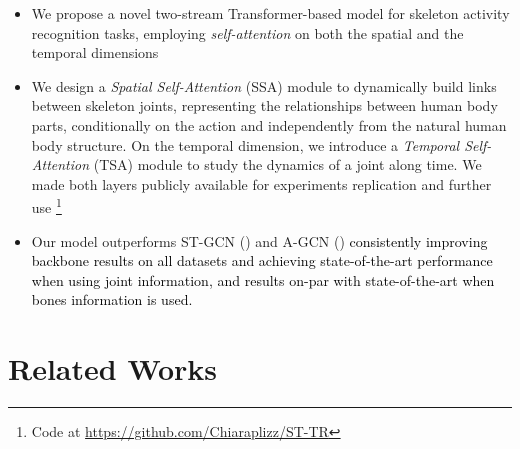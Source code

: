 \documentclass[times,twocolumn,final,authoryear]{elsarticle}
\DeclareRobustCommand{\new}[1]
{{\textcolor{black}{#1}}}
\begin{document}
\begin{itemize}
    \item We propose a novel two-stream Transformer-based model for skeleton activity recognition tasks, employing \textit{self-attention} on both the spatial and the temporal dimensions
    \item We design a \textit{Spatial Self-Attention} (SSA) module to dynamically build links between skeleton joints, representing the relationships between human body parts, conditionally on the action and independently from the natural human body structure. On the temporal dimension, we introduce a  \textit{Temporal Self-Attention} (TSA) module to study the dynamics of a joint along time. We made both layers publicly available for experiments replication and further use \footnote{Code at \color{magenta}\url{https://github.com/Chiaraplizz/ST-TR}}
\item Our model outperforms ST-GCN (\cite{yan2018spatial}) and A-GCN (\cite{Shi2018TwoStreamAG}) \new{consistently improving backbone results on all datasets and achieving state-of-the-art performance when using joint information, and results on-par with state-of-the-art when bones information is used.} 

\end{itemize}

\section{Related Works}
\end{document}
